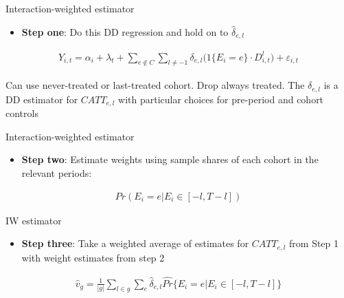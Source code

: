 \documentclass{beamer}
\begin{document}
\begin{frame}{Interaction-weighted estimator}

\begin{itemize}
\item \textbf{Step one}: Do this DD regression and hold on to $\widehat{\delta}_{e,l}$
\end{itemize}

\begin{eqnarray*}
Y_{i,t} = \alpha_i + \lambda_t + \sum_{e \notin C} \sum_{l \neq -1} \delta_{e,l} \big (1 \{ E_i = e \} \cdot D_{i,t}^l \big ) + \varepsilon_{i,t}
\end{eqnarray*}


\bigskip

Can use never-treated or last-treated cohort. Drop always treated. The $\delta_{e,l}$ is a DD estimator for $CATT_{e,l}$ with particular choices for pre-period and cohort controls

\end{frame}


\begin{frame}{Interaction-weighted estimator}

\begin{itemize}
\item \textbf{Step two}: Estimate weights using sample shares of each cohort in the relevant periods:
\end{itemize}

\begin{eqnarray*}
Pr(E_i=e|E_i \in [-l,T-l])
\end{eqnarray*}

\end{frame}

\begin{frame}{IW estimator}

\begin{itemize}
\item \textbf{Step three}: Take a weighted average of estimates for $CATT_{e,l}$ from Step 1 with weight estimates from step 2
\end{itemize}


\begin{eqnarray*}
\widehat{v}_g = \frac{1}{|g|} \sum_{l \in g} \sum_e \widehat{\delta}_{e,l} \widehat{Pr} \{ E_i=e | E_i \in [-l,T-l]\}
\end{eqnarray*}


\end{frame}
\end{document}
